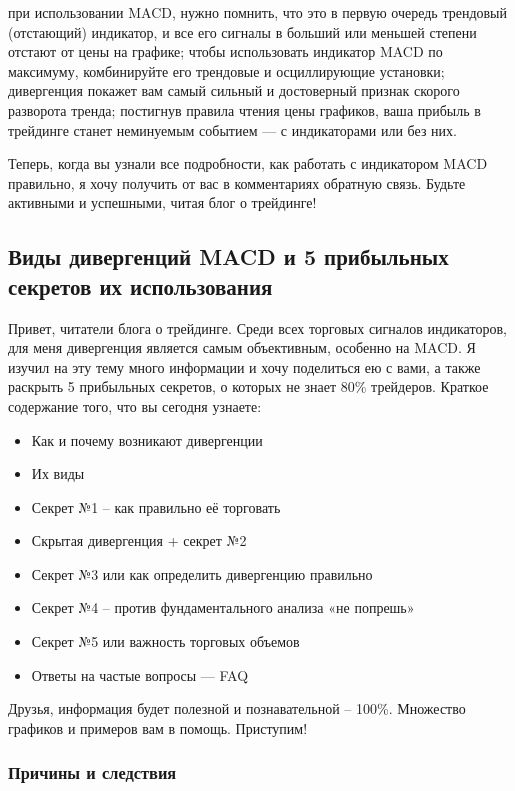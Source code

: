 \documentclass[a5paper]{article}
\begin{document}
    при использовании MACD, нужно помнить, что это в первую очередь трендовый (отстающий) индикатор, и все его сигналы в больший или меньшей степени отстают от цены на графике;
    чтобы использовать индикатор MACD по максимуму, комбинируйте его трендовые и осциллирующие установки;
    дивергенция покажет вам самый сильный и достоверный признак скорого разворота тренда;
    постигнув правила чтения цены графиков, ваша прибыль в трейдинге станет неминуемым событием — с индикаторами или без них.

Теперь, когда вы узнали все подробности, как работать с индикатором MACD правильно, я хочу получить от вас в комментариях обратную связь. Будьте активными и успешными, читая блог о трейдинге!

\subsection{Виды дивергенций MACD и 5 прибыльных секретов их
  использования}

Привет, читатели блога о трейдинге. Среди всех торговых сигналов индикаторов, для меня дивергенция является самым объективным, особенно на MACD. Я изучил на эту тему много информации и хочу поделиться ею с вами, а также раскрыть 5 прибыльных секретов, о которых не знает 80\% трейдеров. Краткое содержание того, что вы сегодня узнаете:
\begin{itemize}
\item         Как и почему возникают дивергенции
\item         Их виды
\item         Секрет №1 – как правильно её торговать
\item         Скрытая дивергенция + секрет №2
\item         Секрет №3 или как определить дивергенцию правильно
\item         Секрет №4 – против фундаментального анализа «не попрешь»
\item         Секрет №5 или важность торговых объемов
\item         Ответы на частые вопросы — FAQ
\end{itemize}

Друзья, информация будет полезной и познавательной – 100\%. Множество
графиков и примеров вам в помощь. Приступим!

\subsubsection{Причины и следствия}
\end{document}
